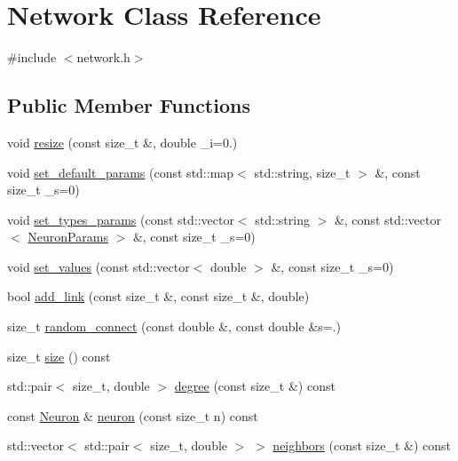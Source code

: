 \hypertarget{classNetwork}{}\section{Network Class Reference}
\label{classNetwork}


{\ttfamily \#include $<$network.\+h$>$}

\subsection*{Public Member Functions}
\begin{DoxyCompactItemize}
\item 
void \hyperlink{classNetwork_ad91ae24f308dd2b46ff76396fcdb9765}{resize} (const size\+\_\+t \&, double \+\_\+i=0.)
\item 
void \hyperlink{classNetwork_ad1d20020028425cfab199da1942172c9}{set\+\_\+default\+\_\+params} (const std\+::map$<$ std\+::string, size\+\_\+t $>$ \&, const size\+\_\+t \+\_\+s=0)
\item 
void \hyperlink{classNetwork_a40daf6578a6146f4c339f0efffd5070d}{set\+\_\+types\+\_\+params} (const std\+::vector$<$ std\+::string $>$ \&, const std\+::vector$<$ \hyperlink{structNeuronParams}{Neuron\+Params} $>$ \&, const size\+\_\+t \+\_\+s=0)
\item 
void \hyperlink{classNetwork_a699416a6462f2da6a5f6cddb30f31440}{set\+\_\+values} (const std\+::vector$<$ double $>$ \&, const size\+\_\+t \+\_\+s=0)
\item 
bool \hyperlink{classNetwork_a6ebe0899329973e4924997a25e205856}{add\+\_\+link} (const size\+\_\+t \&, const size\+\_\+t \&, double)
\item 
size\+\_\+t \hyperlink{classNetwork_a681d8f731ce258376a20f9bf062b943b}{random\+\_\+connect} (const double \&, const double \&s=.)
\item 
size\+\_\+t \hyperlink{classNetwork_a41c54d12d861883170b5c5abca3a7bc8}{size} () const
\item 
std\+::pair$<$ size\+\_\+t, double $>$ \hyperlink{classNetwork_a313da14a6a430ae14e3943dba78edb61}{degree} (const size\+\_\+t \&) const
\item 
const \hyperlink{classNeuron}{Neuron} \& \hyperlink{classNetwork_a4639c4fd24bc6dc807ae35af6577ed7f}{neuron} (const size\+\_\+t n) const
\item 
std\+::vector$<$ std\+::pair$<$ size\+\_\+t, double $>$ $>$ \hyperlink{classNetwork_a98bbf44b077ba1bec5a62ecffc405503}{neighbors} (const size\+\_\+t \&) const
\item 

\end{DoxyCompactItemize}
